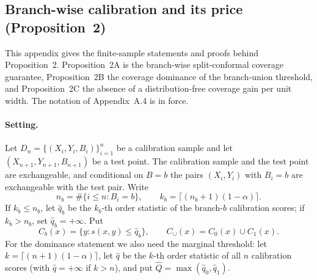 %
%

\newtheorem*{aVpropA}{Proposition 2A}
\newtheorem*{aVpropB}{Proposition 2B}
\newtheorem*{aVpropC}{Proposition 2C}

\providecommand{\theHequation}{}
\let\aVtheHequation\theHequation
{}
\renewcommand{\theHequation}{aV.\arabic{aVanchor}}
\newcommand{\aVfixedtag}[1]{\stepcounter{aVanchor}\tag{#1}}

\subsection{Branch-wise calibration and its price (Proposition~2)}\label{app:a5}

This appendix gives the finite-sample statements and proofs behind
Proposition~2.  Proposition~2A is the branch-wise split-conformal
coverage guarantee, Proposition~2B the coverage dominance of the
branch-union threshold, and Proposition~2C the absence of a
distribution-free coverage gain per unit width.  The notation of
Appendix~A.4 is in force.

\paragraph{Setting.}
Let $D_n=\{(X_i,Y_i,B_i)\}_{i=1}^n$ be a calibration sample and let
$(X_{n+1},Y_{n+1},B_{n+1})$ be a test point.  The calibration sample and
the test point are exchangeable, and conditional on $B=b$ the pairs
$(X_i,Y_i)$ with $B_i=b$ are exchangeable with the test pair.  Write
\[
n_b=\#\{i\le n:B_i=b\},
\qquad
k_b=\bigl\lceil(n_b+1)(1-\alpha)\bigr\rceil.
\]
If $k_b\le n_b$, let $\hat q_b$ be the $k_b$-th order statistic of the
branch-$b$ calibration scores; if $k_b>n_b$, set $\hat q_b=+\infty$.
Put
\[
C_b(x)=\{y:s(x,y)\le\hat q_b\},
\qquad
C_\cup(x)=C_0(x)\cup C_1(x).
\]
For the dominance statement we also need the marginal threshold: let
$k=\lceil(n+1)(1-\alpha)\rceil$, let $\hat q$ be the $k$-th order
statistic of all $n$ calibration scores (with $\hat q=+\infty$ if
$k>n$), and put $\hat Q=\max(\hat q_0,\hat q_1)$.

